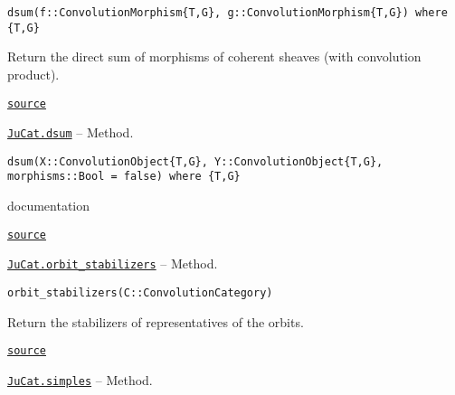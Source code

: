 \documentclass{memoir}
\begin{document}
\begin{adjustwidth}{2em}{0pt}


\begin{verbatim}
dsum(f::ConvolutionMorphism{T,G}, g::ConvolutionMorphism{T,G}) where {T,G}
\end{verbatim}

Return the direct sum of morphisms of coherent sheaves (with convolution product).



\href{https://github.com/FabianMaeurer/JuCat.jl/blob/367390e2d003deec2ababa73caeab405e934bb35/src/structures/ConvolutionCategory/ConvolutionCategory.jl#L125-L129}{\texttt{source}}


\end{adjustwidth}
\hypertarget{4092292824888948722}{} 
\hyperlink{4092292824888948722}{\texttt{JuCat.dsum}}  -- {Method.}

\begin{adjustwidth}{2em}{0pt}


\begin{verbatim}
dsum(X::ConvolutionObject{T,G}, Y::ConvolutionObject{T,G}, morphisms::Bool = false) where {T,G}
\end{verbatim}

documentation



\href{https://github.com/FabianMaeurer/JuCat.jl/blob/367390e2d003deec2ababa73caeab405e934bb35/src/structures/ConvolutionCategory/ConvolutionCategory.jl#L108-L112}{\texttt{source}}


\end{adjustwidth}
\hypertarget{14631726498957465616}{} 
\hyperlink{14631726498957465616}{\texttt{JuCat.orbit\_stabilizers}}  -- {Method.}

\begin{adjustwidth}{2em}{0pt}


\begin{verbatim}
orbit_stabilizers(C::ConvolutionCategory)
\end{verbatim}

Return the stabilizers of representatives of the orbits.



\href{https://github.com/FabianMaeurer/JuCat.jl/blob/367390e2d003deec2ababa73caeab405e934bb35/src/structures/ConvolutionCategory/ConvolutionCategory.jl#L65-L69}{\texttt{source}}


\end{adjustwidth}
\hypertarget{8694340320441112263}{} 
\hyperlink{8694340320441112263}{\texttt{JuCat.simples}}  -- {Method.}
\end{document}
